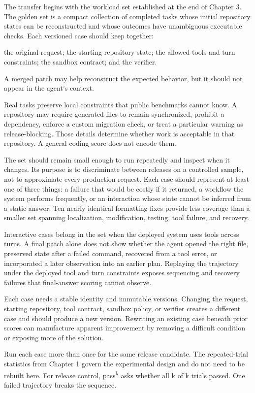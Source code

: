 The transfer begins with the workload set established at the end of Chapter 3. The golden set is a compact collection of completed tasks whose initial repository states can be reconstructed and whose outcomes have unambiguous executable checks. Each versioned case should keep together:

the original request;
the starting repository state;
the allowed tools and turn constraints;
the sandbox contract; and
the verifier.

A merged patch may help reconstruct the expected behavior, but it should not appear in the agent's context.

Real tasks preserve local constraints that public benchmarks cannot know. A repository may require generated files to remain synchronized, prohibit a dependency, enforce a custom migration check, or treat a particular warning as release-blocking. Those details determine whether work is acceptable in that repository. A general coding score does not encode them.

The set should remain small enough to run repeatedly and inspect when it changes. Its purpose is to discriminate between releases on a controlled sample, not to approximate every production request. Each case should represent at least one of three things: a failure that would be costly if it returned, a workflow the system performs frequently, or an interaction whose state cannot be inferred from a static answer. Ten nearly identical formatting fixes provide less coverage than a smaller set spanning localization, modification, testing, tool failure, and recovery.

Interactive cases belong in the set when the deployed system uses tools across turns. A final patch alone does not show whether the agent opened the right file, preserved state after a failed command, recovered from a tool error, or incorporated a later observation into an earlier plan. Replaying the trajectory under the deployed tool and turn constraints exposes sequencing and recovery failures that final-answer scoring cannot observe.

Each case needs a stable identity and immutable versions. Changing the request, starting repository, tool contract, sandbox policy, or verifier creates a different case and should produce a new version. Rewriting an existing case beneath prior scores can manufacture apparent improvement by removing a difficult condition or exposing more of the solution.

Run each case more than once for the same release candidate. The repeated-trial statistics from Chapter 1 govern the experimental design and do not need to be rebuilt here. For release control, pass\textsuperscript{k} asks whether all k of k trials passed. One failed trajectory breaks the sequence.

